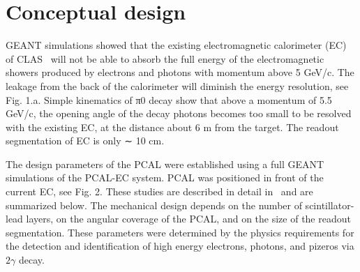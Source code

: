\section{Conceptual design}

GEANT simulations showed that the existing electromagnetic calorimeter (EC) of CLAS~\cite{clas6nsim} will not be able to absorb the full energy of the electromagnetic showers produced by electrons and photons with momentum above 5 GeV/c. The leakage from the back of the calorimeter will diminish the energy resolution, see Fig. 1.a. Simple kinematics of π0 decay show that above a momentum of 5.5 GeV/c, the opening angle of the decay photons becomes too small to be resolved with the existing EC, at the distance about 6 m from the target. The readout segmentation of EC is only ∼ 10 cm. 


The design parameters of the PCAL were established using a full GEANT simulations
of the PCAL-EC system. PCAL was positioned in front of the current EC, see Fig. 2. These
studies are described in detail in~\cite{2007001} and are summarized below. The mechanical design
depends on the number of scintillator-lead layers, on the angular coverage of the PCAL, and
on the size of the readout segmentation. These parameters were determined by the physics
requirements for the detection and identification of high energy electrons, photons, and pizeros
via $2\gamma$ decay.



